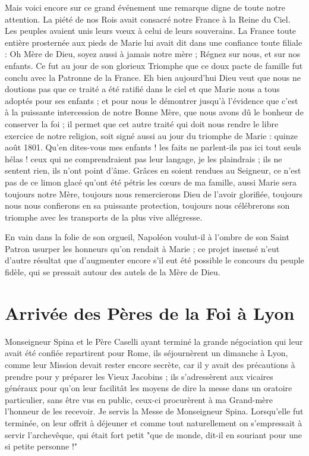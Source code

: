 \documentclass[11pt,a4paper]{report}
\begin{document}
Mais voici encore sur ce grand événement une remarque digne de toute notre attention. La piété de nos Rois avait consacré notre France à la Reine du Ciel. Les peuples avaient unis leurs vœux à celui de leurs souverains. La France toute entière prosternée aux pieds de Marie lui avait dit dans une confiance toute filiale : Oh Mère de Dieu, soyez aussi à jamais notre mère ; Régnez sur nous, et sur nos enfants. Ce fut au jour de son glorieux Triomphe que ce doux pacte de famille fut conclu avec la Patronne de la France. Eh bien aujourd'hui Dieu veut que nous ne doutions pas que ce traité a été ratifié dans le ciel et que Marie nous a tous adoptés pour ses enfants ; et pour nous le démontrer jusqu'à l'évidence que c'est à la puissante intercession de notre Bonne Mère, que nous avons dû le bonheur de conserver la foi ; il permet que cet autre traité qui doit nous rendre le libre exercice de notre religion, soit signé aussi au jour du triomphe de Marie : quinze août 1801. Qu'en dites-vous mes enfants ! les faits ne parlent-ils pas ici tout seuls hélas ! ceux qui ne comprendraient pas leur langage, je les plaindrais ; ils ne sentent rien, ils n'ont point d'âme. Grâces en soient rendues au Seigneur, ce n'est pas de ce limon glacé qu'ont été pétris les cœurs de ma famille, aussi Marie sera toujours notre Mère, toujours nous remercierons Dieu de l'avoir glorifiée, toujours nous nous confierons en sa puissante protection, toujours nous célébrerons son triomphe avec les transports de la plus vive allégresse.

En vain dans la folie de son orgueil, Napoléon voulut-il à l'ombre de son Saint Patron usurper les honneurs qu'on rendait à Marie ; ce projet insensé n'eut d'autre résultat que d'augmenter encore s'il eut été possible le concours du peuple fidèle, qui se pressait autour des autels de la Mère de Dieu.

\section*{Arrivée des Pères de la Foi à Lyon}

Monseigneur Spina et le Père Caselli ayant terminé la grande négociation qui leur avait été confiée repartirent pour Rome, ils séjournèrent un dimanche à Lyon, comme leur Mission devait rester encore secrète, car il y avait des précautions à prendre pour y préparer les Vieux Jacobins ; ils s'adressèrent aux vicaires généraux pour qu'on leur facilitât les moyens de dire la messe dans un oratoire particulier, sans être vus en public, ceux-ci procurèrent à ma Grand-mère l'honneur de les recevoir. Je servis la Messe de Monseigneur Spina. Lorsqu'elle fut terminée, on leur offrit à déjeuner et comme tout naturellement on s'empressait à servir l'archevêque, qui était fort petit "que de monde, dit-il en souriant pour une si petite personne !"
\end{document}
